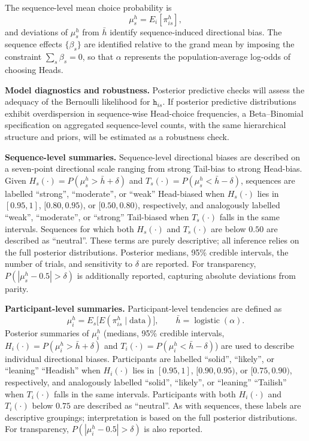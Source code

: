 \documentclass[11pt,a4paper]{article}
\numberwithin{equation}{section}
\begin{document}
The sequence-level mean choice probability is
\[
\mu_s^{h} = E_i[\pi_{is}^{h}],
\]
and deviations of $\mu_s^{h}$ from $\bar{h}$ identify sequence-induced directional bias.
The sequence effects \(\{\beta_s\}\) are identified relative to the grand mean by
imposing the constraint \(\sum_s \beta_s = 0\), so that \(\alpha\) represents the
population-average log-odds of choosing Heads.

\textbf{Model diagnostics and robustness.}
Posterior predictive checks will assess the adequacy of the Bernoulli likelihood for 
$\texttt{h}_{is}$. If posterior predictive distributions exhibit overdispersion in 
sequence-wise Head-choice frequencies, a Beta--Binomial specification on aggregated 
sequence-level counts, with the same hierarchical structure and priors, will be 
estimated as a robustness check.

\textbf{Sequence-level summaries.}
Sequence-level directional biases are described on a seven-point directional scale 
ranging from strong Tail-bias to strong Head-bias. Given 
$H_s(\cdot) = P(\mu_s^{h} > \bar{h} + \delta)$ and 
$T_s(\cdot) = P(\mu_s^{h} < \bar{h} - \delta)$, sequences are labelled 
\enquote{strong}, \enquote{moderate}, or \enquote{weak} Head-biased when $H_s(\cdot)$ 
lies in $[0.95,1]$, $[0.80,0.95)$, or $[0.50,0.80)$, respectively, and analogously 
labelled \enquote{weak}, \enquote{moderate}, or \enquote{strong} Tail-biased when 
$T_s(\cdot)$ falls in the same intervals. Sequences for which both $H_s(\cdot)$ and 
$T_s(\cdot)$ are below $0.50$ are described as \enquote{neutral}. These terms are 
purely descriptive; all inference relies on the full posterior distributions. 
Posterior medians, 95\% credible intervals, the number of trials, and sensitivity 
to $\delta$ are reported. For transparency, 
$P(|\mu_s^{h} - 0.5| > \delta)$ is additionally reported, capturing absolute 
deviations from parity.

\textbf{Participant-level summaries.}
Participant-level tendencies are defined as
\[
\mu_i^{h} = E_s\!\big[E(\pi_{is}^{h} \mid \text{data})\big],
\qquad 
\bar{h} = \operatorname{logistic}(\alpha).
\]
Posterior summaries of $\mu_i^{h}$ (medians, 95\% credible intervals, 
$H_i(\cdot) = P(\mu_i^{h} > \bar{h} + \delta)$ and 
$T_i(\cdot) = P(\mu_i^{h} < \bar{h} - \delta)$) are used to describe individual 
directional biases. Participants are labelled \enquote{solid}, \enquote{likely}, or 
\enquote{leaning} \enquote{Headish} when $H_i(\cdot)$ lies in $[0.95,1]$, 
$[0.90,0.95)$, or $[0.75,0.90)$, respectively, and analogously labelled 
\enquote{solid}, \enquote{likely}, or \enquote{leaning} \enquote{Tailish} when 
$T_i(\cdot)$ falls in the same intervals. Participants with both $H_i(\cdot)$ and 
$T_i(\cdot)$ below $0.75$ are described as \enquote{neutral}. As with sequences, these 
labels are descriptive groupings; interpretation is based on the full posterior 
distributions. For transparency, $P(|\mu_i^{h} - 0.5| > \delta)$ is also reported.
	
\end{document}
